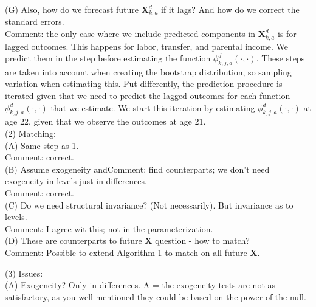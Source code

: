 \noindent (G) Also, how do we forecast future $ \bm{X}_{k,a}^d$ if it lags? And how do we correct the standard errors.\\
\noindent Comment: the only case where we include predicted components in $ \bm{X}_{k,a}^d$ is for lagged outcomes. This happens for labor, transfer, and parental income. We predict them in the step before estimating the function $\phi_{k,j,a}^d \left( \cdot, \cdot \right)$. These steps are taken into account when creating the bootstrap distribution, so sampling variation when estimating this. Put differently, the prediction procedure is iterated given that we need to predict the lagged outcomes for each function $\phi_{k,j,a}^d \left( \cdot, \cdot \right)$ that we estimate. We start this iteration by estimating $\phi_{k,j,a}^d \left( \cdot, \cdot \right)$ at age 22, given that we observe the outcomes at age 21.\\ 



\noindent (2) Matching:\\ 
\noindent (A) Same step as 1.\\
\noindent Comment: correct.\\

\noindent (B) Assume exogeneity andComment:  find counterparts; we don't need exogeneity in levels just in differences.\\
\noindent Comment: correct.\\

\noindent (C) Do we need structural invariance? (Not necessarily). But invariance as to levels.\\
\noindent Comment: I agree wit this; not in the parameterization.\\

\noindent (D) These are counterparts to future $\bm{X}$ question - how to match?\\ 
\noindent Comment: Possible to extend Algorithm 1 to match on all future $\bm{X}$. 

\noindent (3) Issues:\\

\noindent (A) Exogeneity? Only in differences. 
\noindent A = the exogeneity tests are not as satisfactory, as you well mentioned they could be based on the power of the null.\\


